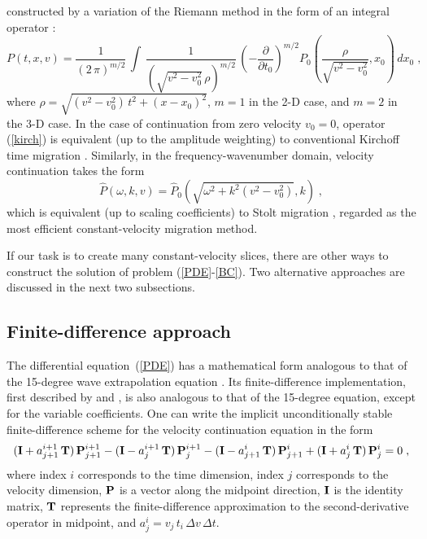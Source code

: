constructed by a variation of the Riemann method in the form of an
integral operator \cite[]{me,first}:
\begin{equation}
  P(t,x,v) = {\frac{1}{(2\,\pi)^{m/2}}}\,\int\, 
  {\frac{1}{(\sqrt{v^2-v_0^2}\,\rho)^{m/2}}}\, 
  \left(- \frac{\partial}{\partial t_0}\right)^{m/2}
  P_0\left(\frac{\rho}{\sqrt{v^2-v_0^2}},x_0\right)\,dx_0\;,
\label{kirch}
\end{equation}
where $\rho = \sqrt{(v^2-v_0^2)\,t^2 + (x - x_0)^2}$, $m=1$ in the 2-D
case, and $m=2$ in the 3-D case. In the case of continuation from zero
velocity $v_0=0$, operator (\ref{kirch}) is equivalent (up to the
amplitude weighting) to conventional Kirchoff time migration
\cite[]{GEO43-01-00490076}.  Similarly, in the frequency-wavenumber
domain, velocity continuation takes the form
\begin{equation}
  \label{stolt}
  \hat{P} (\omega,k,v) = \hat{P}_0 (\sqrt{\omega^2+k^2 (v^2-v_0^2)},k)\;,
\end{equation}
which is equivalent (up to scaling coefficients) to Stolt migration
\cite[]{GEO43-01-00230048}, regarded as the most efficient constant-velocity
migration method.
\par
If our task is to create many constant-velocity slices, there are
other ways to construct the solution of problem (\ref{PDE}-\ref{BC}).
Two alternative approaches are discussed in the next two
subsections.
\subsection{Finite-difference approach}
The differential equation~(\ref{PDE}) has a mathematical form
analogous to that of the 15-degree wave extrapolation equation
\cite[]{Claerbout.blackwell.76}. Its finite-difference implementation,
first described by \cite{Claerbout.sep.48.79} and \cite{Li.sep.48.85},
is also analogous to that of the 15-degree equation, except for the
variable coefficients. One can write the implicit unconditionally
stable finite-difference scheme for the velocity continuation equation
in the form
\begin{equation}
({\bf I} + a_{j+1}^{i+1}\,{\bf T})\,{\bf P}_{j+1}^{i+1} - 
({\bf I} - a_{j}^{i+1}\,{\bf T})\,{\bf P}_{j}^{i+1} -
({\bf I} - a_{j+1}^{i}\,{\bf T})\,{\bf P}_{j+1}^{i} + 
({\bf I} + a_{j}^{i}\,{\bf T})\,{\bf P}_{j}^{i} = 0\;, 
\label{eqn:fds} 
\end{equation}
where index $i$ corresponds to the time dimension, index $j$
corresponds to the velocity dimension, ${\bf P}$ is a vector along the
midpoint direction, ${\bf I}$ is the identity matrix, ${\bf T}$
represents the finite-difference approximation to the 
second-derivative operator in midpoint,
and $a_{j}^{i} = v_j\,t_i\,{\Delta v\,\Delta t}$.


